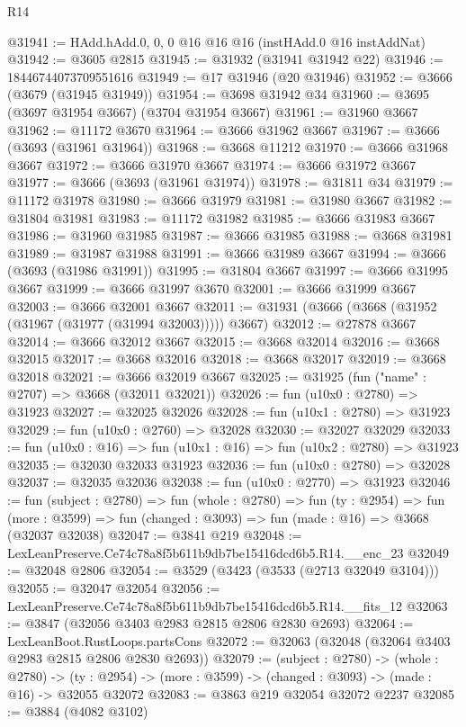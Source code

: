 \begin{lexlean}{R14}
\begin{coremodule}
@31941 := HAdd.hAdd.{0, 0, 0} @16 @16 @16 (instHAdd.{0} @16 instAddNat)
@31942 := @3605 @2815
@31945 := @31932 (@31941 @31942 @22)
@31946 := 18446744073709551616
@31949 := @17 @31946 (@20 @31946)
@31952 := @3666 (@3679 (@31945 @31949))
@31954 := @3698 @31942 @34
@31960 := @3695 (@3697 @31954 @3667) (@3704 @31954 @3667)
@31961 := @31960 @3667
@31962 := @11172 @3670
@31964 := @3666 @31962 @3667
@31967 := @3666 (@3693 (@31961 @31964))
@31968 := @3668 @11212
@31970 := @3666 @31968 @3667
@31972 := @3666 @31970 @3667
@31974 := @3666 @31972 @3667
@31977 := @3666 (@3693 (@31961 @31974))
@31978 := @31811 @34
@31979 := @11172 @31978
@31980 := @3666 @31979
@31981 := @31980 @3667
@31982 := @31804 @31981
@31983 := @11172 @31982
@31985 := @3666 @31983 @3667
@31986 := @31960 @31985
@31987 := @3666 @31985
@31988 := @3668 @31981
@31989 := @31987 @31988
@31991 := @3666 @31989 @3667
@31994 := @3666 (@3693 (@31986 @31991))
@31995 := @31804 @3667
@31997 := @3666 @31995 @3667
@31999 := @3666 @31997 @3670
@32001 := @3666 @31999 @3667
@32003 := @3666 @32001 @3667
@32011 := @31931 (@3666 (@3668 (@31952 (@31967 (@31977 (@31994 @32003))))) @3667)
@32012 := @27878 @3667
@32014 := @3666 @32012 @3667
@32015 := @3668 @32014
@32016 := @3668 @32015
@32017 := @3668 @32016
@32018 := @3668 @32017
@32019 := @3668 @32018
@32021 := @3666 @32019 @3667
@32025 := @31925 (fun ("name" : @2707) => @3668 (@32011 @32021))
@32026 := fun (u10x0 : @2780) => @31923
@32027 := @32025 @32026
@32028 := fun (u10x1 : @2780) => @31923
@32029 := fun (u10x0 : @2760) => @32028
@32030 := @32027 @32029
@32033 := fun (u10x0 : @16) => fun (u10x1 : @16) => fun (u10x2 : @2780) => @31923
@32035 := @32030 @32033 @31923
@32036 := fun (u10x0 : @2780) => @32028
@32037 := @32035 @32036
@32038 := fun (u10x0 : @2770) => @31923
@32046 := fun (subject : @2780) =>
  fun (whole : @2780) =>
  fun (ty : @2954) =>
  fun (more : @3599) => fun (changed : @3093) => fun (made : @16) => @3668 (@32037 @32038)
@32047 := @3841 @219
@32048 := LexLeanPreserve.Ce74c78a8f5b611b9db7be15416dcd6b5.R14.__enc_23
@32049 := @32048 @2806
@32054 := @3529 (@3423 (@3533 (@2713 @32049 @3104)))
@32055 := @32047 @32054
@32056 := LexLeanPreserve.Ce74c78a8f5b611b9db7be15416dcd6b5.R14.__fits_12
@32063 := @3847 (@32056 @3403 @2983 @2815 @2806 @2830 @2693)
@32064 := LexLeanBoot.RustLoops.partsCons
@32072 := @32063 (@32048 (@32064 @3403 @2983 @2815 @2806 @2830 @2693))
@32079 := (subject : @2780) ->
  (whole : @2780) ->
  (ty : @2954) -> (more : @3599) -> (changed : @3093) -> (made : @16) -> @32055 @32072
@32083 := @3863 @219 @32054 @32072 @2237
@32085 := @3884 (@4082 @3102)

\end{coremodule}
\end{lexlean}
